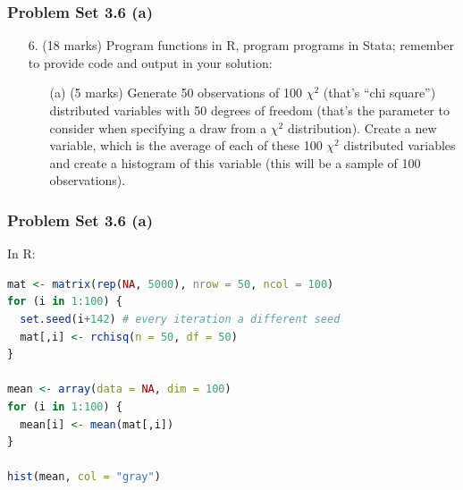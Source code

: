 \documentclass[xcolor=table]{beamer}
\begin{document}



\begin{frame}
\frametitle{Problem Set 3.6 (a)}
\begin{enumerate}
\item[6.] (18 marks) Program functions in R, program programs in Stata; remember to provide code and output in your solution:
\begin{enumerate}
\item[(a)] (5 marks) Generate 50 observations of 100 $\chi^2$ (that's ``chi square'') distributed variables with 50 degrees of freedom (that's the parameter to consider when specifying a draw from a $\chi^2$ distribution). 
Create a new variable, which is the average of each of these 100 $\chi^2$ distributed variables and create a histogram of this variable (this will be a sample of 100 observations). 
\end{enumerate}
\end{enumerate}
\end{frame}

\begin{frame}[fragile]
\frametitle{Problem Set 3.6 (a)}
In R:
\begin{lstlisting}[language = R]
mat <- matrix(rep(NA, 5000), nrow = 50, ncol = 100)
for (i in 1:100) {
  set.seed(i+142) # every iteration a different seed
  mat[,i] <- rchisq(n = 50, df = 50)
}

mean <- array(data = NA, dim = 100)
for (i in 1:100) {
  mean[i] <- mean(mat[,i])
}

hist(mean, col = "gray")
\end{lstlisting}
\end{frame}
\end{document}
